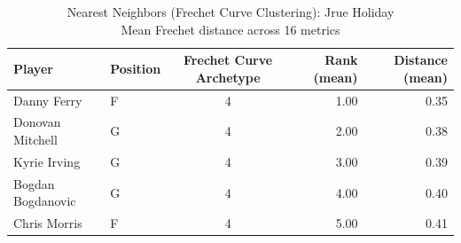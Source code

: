 \begin{table}[t]
\caption*{
{\fontsize{20}{25} Nearest Neighbors (Frechet Curve Clustering): Jrue Holiday\fontsize{12}{15}\selectfont } \\ 
{\fontsize{14}{17}\selectfont  Mean Frechet distance across 16 metrics\fontsize{12}{15}\selectfont }
} 
\fontsize{12.0pt}{14.0pt}\selectfont
\begin{tabular*}{\linewidth}{@{\extracolsep{\fill}}llcrr}
\toprule
Player & Position & Frechet Curve Archetype & Rank (mean) & Distance (mean) \\ 
\midrule\addlinespace[2.5pt]
Danny Ferry & F & 4 & 1.00 & 0.35 \\ 
Donovan Mitchell & G & 4 & 2.00 & 0.38 \\ 
Kyrie Irving & G & 4 & 3.00 & 0.39 \\ 
Bogdan Bogdanovic & G & 4 & 4.00 & 0.40 \\ 
Chris Morris & F & 4 & 5.00 & 0.41 \\ 
\bottomrule
\end{tabular*}
\end{table}

